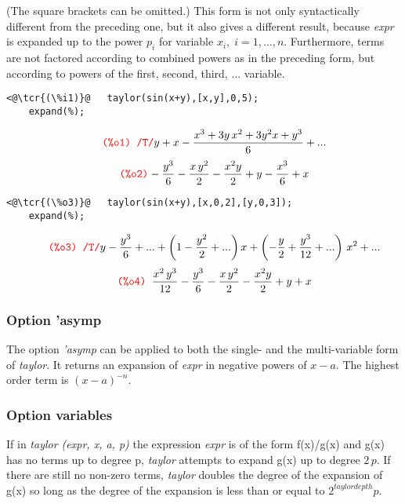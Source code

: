 \documentclass[../Maxima_Workbook.tex]{subfiles}
\begin{document}
\lz (The square brackets can be omitted.) This form is not only syntactically different from the preceding one, but it also gives a different result, because \emph{expr} is expanded up to the power $ p_i $ for variable $ x_i, \; i=1,\dots,n $. Furthermore, terms are not factored according to combined powers as in the preceding form, but according to powers of the first, second, third, $ \dots $ variable.

\lz \begin{small}
\color{blue} \leqn
\begin{lstlisting}
<@\tcr{(\%i1)}@   taylor(sin(x+y),[x,y],0,5);
	expand(%);
\end{lstlisting}
\vspace{-4mm} \[ \tag*{\tcr{\ttfamily (\%o1) /T/}} y+x-\frac{{{x}^{3}}+3 y\, {{x}^{2}}+3 {{y}^{2}} x+{{y}^{3}}}{6}+\mbox{...} \]
\vspace{-5mm} \[ \tag*{\tcr{\ttfamily (\%o2)}} -\frac{{{y}^{3}}}{6}-\frac{x\, {{y}^{2}}}{2}-\frac{{{x}^{2}} y}{2}+y-\frac{{{x}^{3}}}{6}+x \]
\vspace{-2mm} \begin{lstlisting}
<@\tcr{(\%o3)}@   taylor(sin(x+y),[x,0,2],[y,0,3]);
	expand(%);
\end{lstlisting}
\vspace{-4mm} \[ \tag*{\tcr{\ttfamily (\%o3) /T/}} y-\frac{{{y}^{3}}}{6}+\mbox{...}+\left( 1-\frac{{{y}^{2}}}{2}+\mbox{...}\right)  x+\left( -\frac{y}{2}+\frac{{{y}^{3}}}{12}+\mbox{...}\right) \, {{x}^{2}}+\mbox{...} \]
\vspace{-5mm} \[ \tag*{\tcr{\ttfamily (\%o4) }} \frac{{{x}^{2}}\, {{y}^{3}}}{12}-\frac{{{y}^{3}}}{6}-\frac{x\, {{y}^{2}}}{2}-\frac{{{x}^{2}} y}{2}+y+x \]
\color{black} \reqn
\end{small} \vspace{-5mm} 

\subsubsection{Option 'asymp}

The option \emph{'asymp} can be applied to both the single- and the multi-variable form of \emph{taylor}. It returns an expansion of \emph{expr} in negative powers of $ x - a $. The highest order term is $ (x - a)^{-n} $.

\subsubsection{Option variables}

\lz {} \qquad {} \hfill {}

\lz If in \emph{taylor (expr, x, a, p)} the expression \emph{expr} is of the form f(x)/g(x) and g(x) has no terms up to degree p, \emph{taylor} attempts to expand g(x) up to degree $ 2 \, p $. If there are still no non-zero terms, \emph{taylor} doubles the degree of the expansion of g(x) so long as the degree of the expansion is less than or equal to $ 2^{taylordepth} p $.
\end{document}
